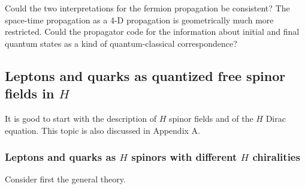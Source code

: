 \documentclass[10pt,epsf]{article}
\begin{document}
Could the two interpretations for the  fermion propagation be consistent? The  space-time propagation as a 4-D propagation is geometrically much more restricted.  Could the propagator code for the information about initial and final quantum states  as a kind of quantum-classical correspondence?



\subsection{Leptons and quarks as quantized free spinor fields in $H$}

It is good to start with the description of $H$ spinor fields and of the $H$ Dirac equation. This topic is also discussed in Appendix A.

\subsubsection{Leptons and quarks as $H$ spinors with different $H$ chiralities}

Consider first the general theory.
\end{document}
